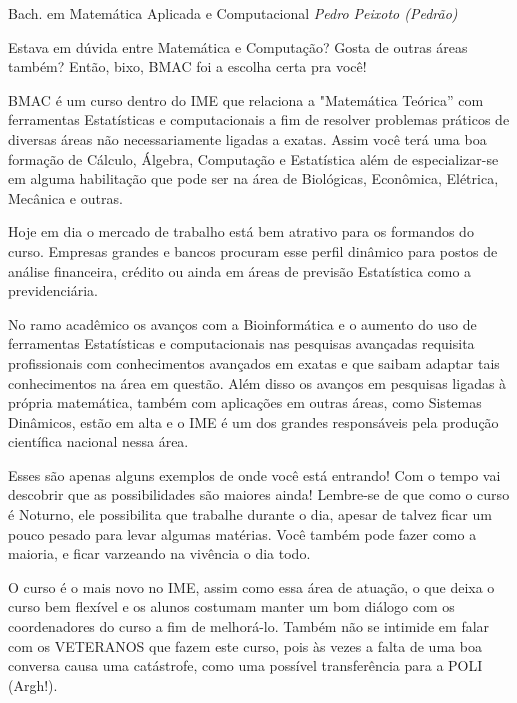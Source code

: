 

\begin{subsecao}{Bach. em Matemática Aplicada e Computacional}
{\em Pedro Peixoto (Pedrão)}

Estava em dúvida entre Matemática e Computação? Gosta de outras áreas também?
Então, bixo, BMAC foi a escolha certa pra você!

BMAC é um curso dentro do IME que relaciona a "Matemática Teórica” com
ferramentas Estatísticas e computacionais a fim de resolver problemas práticos
de diversas áreas não necessariamente ligadas a exatas. Assim você terá uma boa
formação de Cálculo, Álgebra, Computação e Estatística além de especializar-se
em alguma habilitação que pode ser na área de Biológicas, Econômica, Elétrica,
Mecânica e outras.

Hoje em dia o mercado de trabalho está bem atrativo para os formandos do curso.
Empresas grandes e bancos procuram esse perfil dinâmico para postos de análise
financeira, crédito ou ainda em áreas de previsão Estatística como a
previdenciária.

No ramo acadêmico os avanços com a Bioinformática e o aumento do uso de
ferramentas Estatísticas e computacionais nas pesquisas avançadas requisita
profissionais com conhecimentos avançados em exatas e que saibam adaptar tais
conhecimentos na área em questão. Além disso os avanços em pesquisas ligadas à
própria matemática, também com aplicações em outras áreas, como Sistemas
Dinâmicos, estão em alta e o IME é um dos grandes responsáveis pela produção
científica nacional nessa área.

Esses são apenas alguns exemplos de onde você está entrando! Com o tempo vai
descobrir que as possibilidades são maiores ainda! Lembre-se de que como o
curso é Noturno, ele possibilita que trabalhe durante o dia, apesar de talvez
ficar um pouco pesado para levar algumas matérias. Você também pode fazer como
a maioria, e ficar varzeando na vivência o dia todo.

O curso é o mais novo no IME, assim como essa área de atuação, o que deixa o
curso bem flexível e os alunos costumam manter um bom diálogo com os
coordenadores do curso a fim de melhorá-lo. Também não se intimide em falar com
os VETERANOS que fazem este curso, pois às vezes a falta de uma boa conversa
causa uma catástrofe, como uma possível transferência para a POLI (Argh!).


\end{subsecao}
